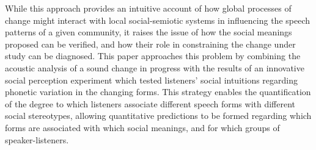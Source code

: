 \documentclass[PWPL]{article}
\begin{document}
While this approach provides an intuitive account of how global processes of change might interact with local social-semiotic systems in influencing the speech patterns of a given community, it raises the issue of how the social meanings proposed can be verified, and how their role in constraining the change under study can be diagnosed. This paper approaches this problem by combining the acoustic analysis of a sound change in progress with the results of an innovative social perception experiment which tested listeners' social intuitions regarding phonetic variation in the changing forms. This strategy enables the quantification of the degree to which listeners associate different speech forms with different social stereotypes, allowing quantitative predictions to be formed regarding which forms are associated with which social meanings, and for which groups of speaker-listeners. 







\end{document}
